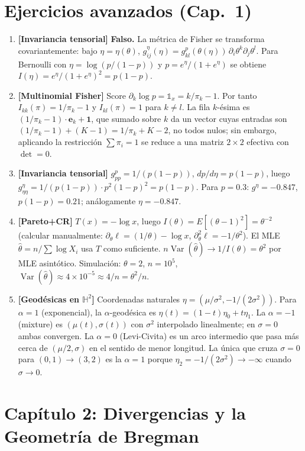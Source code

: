 \section*{Ejercicios avanzados (Cap.~1)}
\begin{enumerate}
	\item \textbf{[Invariancia tensorial]} \textbf{Falso.} La métrica de Fisher se transforma covariantemente: bajo $\eta=\eta(\theta)$, $g^{\eta}_{ij}(\eta)=g^p_{kl}(\theta(\eta))\,\partial_i\theta^k\partial_j\theta^l$. Para Bernoulli con $\eta=\log(p/(1-p))$ y $p=e^\eta/(1+e^\eta)$ se obtiene $I(\eta)=e^\eta/(1+e^\eta)^2=p(1-p)$.
	\item \textbf{[Multinomial Fisher]} Score $\partial_k\log p = \mathbb{1}_x{=}k/\pi_k - 1$. Por tanto $I_{kk}(\pi)=1/\pi_k - 1$ y $I_{kl}(\pi)=1$ para $k\ne l$. La fila $k$-\'esima es $(1/\pi_k - 1) \cdot \mathbf{e}_k + \mathbf{1}$, que sumado sobre $k$ da un vector cuyas entradas son $(1/\pi_k - 1) + (K-1) = 1/\pi_k + K - 2$, no todos nulos; sin embargo, aplicando la restricción $\sum\pi_i=1$ se reduce a una matriz $2\times 2$ efectiva con $\det=0$.
	\item \textbf{[Invariancia tensorial]} $g^p_{pp}=1/(p(1-p))$, $dp/d\eta=p(1-p)$, luego $g^\eta_{\eta\eta}=1/(p(1-p)) \cdot p^2(1-p)^2 = p(1-p)$. Para $p=0.3$: $g^\eta=-0.847$, $p(1-p)=0.21$; análogamente $\eta=-0.847$. \checkmark
	\item \textbf{[Pareto+CR]} $T(x)=-\log x$, luego $I(\theta)=E[(\theta-1)^2]=\theta^{-2}$ (calcular manualmente: $\partial_\theta\ell=(1/\theta)-\log x$, $\partial_\theta^2\ell=-1/\theta^2$). El MLE $\hat\theta=n/\sum\log X_i$ usa $T$ como suficiente. $n\operatorname{Var}(\hat\theta)\to 1/I(\theta)=\theta^2$ por MLE asintótico. Simulación: $\theta=2$, $n=10^5$, $\operatorname{Var}(\hat\theta)\approx 4\times 10^{-5}\approx 4/n=\theta^2/n$. \checkmark
	\item \textbf{[Geodésicas en $\mathbb{H}^2$]} Coordenadas naturales $\eta=(\mu/\sigma^2,-1/(2\sigma^2))$. Para $\alpha=1$ (exponencial), la $\alpha$-geodésica es $\eta(t)=(1-t)\eta_0+t\eta_1$. La $\alpha=-1$ (mixture) es $(\mu(t),\sigma(t))$ con $\sigma^2$ interpolado linealmente; en $\sigma=0$ ambas convergen. La $\alpha=0$ (Levi-Civita) es un arco intermedio que pasa más cerca de $(\mu/2,\sigma)$ en el sentido de menor longitud. La única que cruza $\sigma=0$ para $(0,1)\to(3,2)$ es la $\alpha=1$ porque $\eta_2=-1/(2\sigma^2)\to-\infty$ cuando $\sigma\to 0$.
\end{enumerate}

\section*{Capítulo 2: Divergencias y la Geometría de Bregman}


